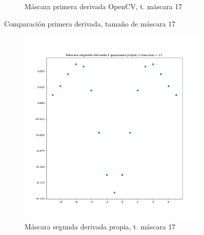 \documentclass[12pt, spanish]{article}
\begin{document}
\begin{figure}[H]
\begin{subfigure}[t]{0.4\textwidth}
 		 \caption{Máscara primera derivada OpenCV, t. máscara 17}
	\end{subfigure}
	\caption{Comparación primera derivada, tamaño de máscara 17}
  	\label{fig:ej1c5}
\end{figure}


\begin{figure}[H]
  \centering
	\begin{subfigure}[t]{0.4\textwidth}
		\centering
		\includegraphics[width = \textwidth]{cmp-2p17.png}
 		 \caption{Máscara segunda derivada propia, t. máscara 17}
	\end{subfigure}
	\hspace{1cm}
	\begin{subfigure}[t]{0.4\textwidth}
		\centering

\end{subfigure}
\end{figure}
\end{document}
